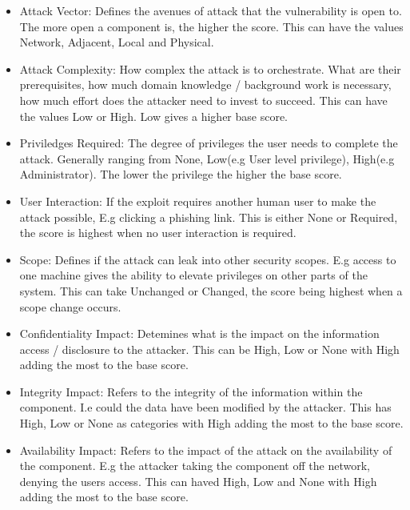 \documentclass[12pt]{article}
\begin{document}
\begin{itemize}

	\item Attack Vector: Defines the avenues of attack that the vulnerability is open to. The more
	      open a component is, the higher the score. This can have the values Network, Adjacent, Local
	      and Physical.

	\item Attack Complexity: How complex the attack is to orchestrate. What are their prerequisites,
	      how much domain knowledge / background work is necessary, how much effort does the attacker
	      need to invest to succeed. This can have the values Low or High. Low gives a higher base
	      score.

	\item Priviledges Required: The degree of privileges the user needs to complete the attack.
	      Generally ranging from None, Low(e.g User level privilege), High(e.g Administrator). The
	      lower the privilege the higher the base score.

	\item User Interaction: If the exploit requires another human user to make the attack possible,
	      E.g clicking a phishing link. This is either None or Required, the score is highest when no
	      user interaction is required.

	\item Scope: Defines if the attack can leak into other security scopes. E.g access to one
	      machine gives the ability to elevate privileges on other parts of the system. This can take
	      Unchanged or Changed, the score being highest when a scope change occurs.

	\item Confidentiality Impact: Detemines what is the impact on the information access /
	      disclosure to the attacker. This can be High, Low or None with High adding the most to the
	      base score.

	\item Integrity Impact: Refers to the integrity of the information within the component. I.e
	      could the data have been modified by the attacker. This has High, Low or None as categories
	      with High adding the most to the base score.

	\item Availability Impact: Refers to the impact of the attack on the availability of the
	      component. E.g the attacker taking the component off the network, denying the users access.
	      This can haved High, Low and None with High adding the most to the base score.

\end{itemize}
\end{document}
